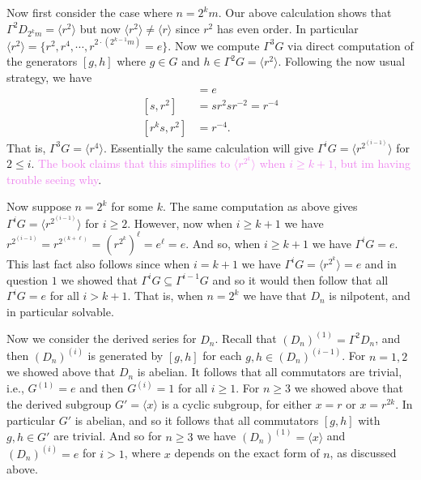 \documentclass[12pt,letterpaper,boxed]{hmcpset}
\newcommand{\wg}[1]{\textcolor{violet}{#1}}
\newcommand{\anglee}[1]{\langle #1 \rangle}
\begin{document}
\begin{solution}
Now first consider the case where $n = 2^km$. Our above calculation
shows that $\Gamma^{2}D_{2^km} = \anglee{r^2}$ but now $\anglee{r^2}
\neq \anglee r$ since $r^2$ has even order. In particular
$\anglee{r^2} = \{r^2, r^4, \cdots, r^{2\cdot(2^{k-1}m)} = e\}$. 
Now we compute $\Gamma^3 G$ via direct computation of the generators
$[g,h]$ where $g \in G$ and $h \in \Gamma^2G = \anglee{r^2}$.
Following the now usual strategy, we have 
\begin{align*}
	[r^k, r^2] &= e \\
	[s, r^2] &= sr^2 s r^{-2} = r^{-4} \\
	[r^ks, r^2] &= r^{-4}.
\end{align*}
That is, $\Gamma^3 G = \anglee{r^4}$. Essentially the same calculation
will give $\Gamma^i G = \anglee{r^{2^{(i-1)}}}$ for $2 \leq i$.
\wg{The book claims that this simplifies to $\anglee{r^{2^k}}$ when
$i \geq k+1$, but im having trouble seeing why}.

Now suppose $n = 2^k$ for some $k$. The same computation as above
gives $\Gamma^i G = \anglee{r^{2^(i-1)}}$ for $i \geq 2$. However, now
when $i \geq k+1$ we have $r^{2^(i-1)} = r^{2^(k+\ell)} =
(r^{2^k})^\ell = e^\ell = e$. And so, when $i \geq k+1$ we have 
$\Gamma^i G = e$. This last fact also follows since when $i = k+1$ we
have $\Gamma^i G = \anglee{r^{2^k}} = e$ and in question $1$ we showed
that $\Gamma^i G \subseteq \Gamma^{i-1}G$ and so it would then follow
that all $\Gamma^i G = e$ for all $i > k+1$.
That is, when $n = 2^k$ we have that $D_n$ is nilpotent, and in particular solvable. 

Now we consider the derived series for $D_n$. Recall that $(D_n)^{(1)}
= \Gamma^2 D_n$, and then $(D_n)^{(i)}$ is generated by $[g,h]$ for
each $g, h \in (D_n)^{(i-1)}$. For $n=1,2$ we showed above that $D_n$
is abelian. It follows that all commutators are trivial, i.e.,
$G^{(1)} = e$ and then $G^{(i)} = 1$ for all $i \geq 1$.
For $n \geq 3$ we showed above that the derived subgroup $G' = \anglee
x$ is a cyclic subgroup, for either $x = r$ or $x = r^{2k}$.
In particular $G'$ is abelian, and so it follows that all commutators
$[g,h]$ with $g, h \in G'$ are trivial. And so for $n \geq 3$ we have
$(D_n)^{(1)} = \anglee{x}$ and $(D_n)^{(i)} = e$ for $i > 1$, where
$x$ depends on the exact form of $n$, as discussed above.

\end{solution}

\newpage

\end{document}
